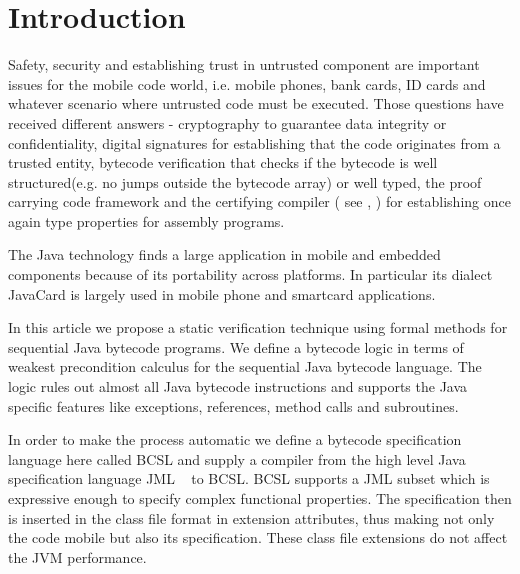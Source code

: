 
\section{Introduction}\label{intro}
Safety, security and establishing trust in untrusted component are important issues for the mobile code world, 
i.e. mobile phones, bank cards, ID cards and whatever scenario where 
untrusted code must be executed. Those questions have received different answers - cryptography to guarantee data integrity or confidentiality,
 digital signatures for establishing that the code originates from a trusted entity, bytecode verification that checks if the bytecode 
 is well structured(e.g. no jumps outside the bytecode array) or well typed, 
 the proof carrying code framework  and the certifying compiler ( see  \cite{ComNec},\cite{DesNecLee98} ) for establishing once 
 again type properties for assembly programs.  



The Java technology finds a large application in mobile and embedded components because of its portability across platforms. In particular its dialect JavaCard is largely used in mobile phone and smartcard applications. 

In this article we propose a static verification technique using formal methods for sequential Java bytecode programs.
We define a bytecode logic in terms of weakest precondition calculus for the sequential Java bytecode language. The logic rules out 
almost all Java bytecode instructions and supports the Java specific features like 
exceptions, references, method calls and subroutines.  
 
 In order to make the process automatic we define a bytecode specification language here called BCSL and supply a compiler from 
 the high level Java specification language JML ~\cite{JMLRefMan} to BCSL. 
 BCSL supports a JML subset which is expressive enough to specify complex functional properties. The specification then is 
 inserted in the class file format in extension attributes, thus making not only the code mobile but also its specification. These class
 file extensions do not affect the JVM performance.

